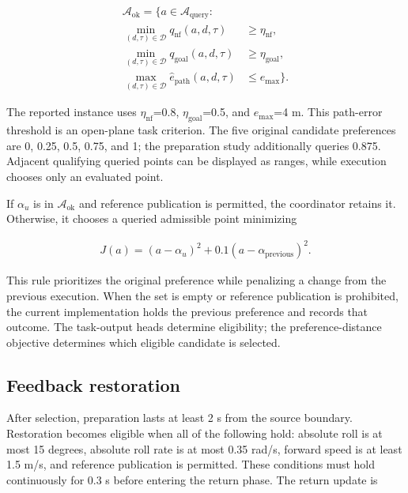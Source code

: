 \documentclass[journal]{IEEEtran}
\begin{document}
\begin{equation}\begin{aligned}
\mathcal A_{\mathrm{ok}}=\Big\{a\in\mathcal A_{\mathrm{query}}:\quad&\\
\min_{(d,\tau)\in\mathcal D}q_{\mathrm{nf}}(a,d,\tau)&\ge\eta_{\mathrm{nf}},\\
\min_{(d,\tau)\in\mathcal D}q_{\mathrm{goal}}(a,d,\tau)&\ge\eta_{\mathrm{goal}},\\
\max_{(d,\tau)\in\mathcal D}\hat e_{\mathrm{path}}(a,d,\tau)&\le e_{\max}\Big\}.
\end{aligned}\end{equation}

The reported instance uses $\eta_{\mathrm{nf}}$=0.8, $\eta_{\mathrm{goal}}$=0.5, and $e_{\max}$=4 m. This path-error threshold is an open-plane task criterion. The five original candidate preferences are 0, 0.25, 0.5, 0.75, and 1; the preparation study additionally queries 0.875. Adjacent qualifying queried points can be displayed as ranges, while execution chooses only an evaluated point.


If $\alpha_u$ is in $\mathcal A_{\mathrm{ok}}$ and reference publication is permitted, the coordinator retains it. Otherwise, it chooses a queried admissible point minimizing



\begin{equation}\begin{aligned}
J(a)=(a-\alpha_u)^2+0.1(a-\alpha_{\mathrm{previous}})^2.
\end{aligned}\end{equation}

This rule prioritizes the original preference while penalizing a change from the previous execution. When the set is empty or reference publication is prohibited, the current implementation holds the previous preference and records that outcome. The task-output heads determine eligibility; the preference-distance objective determines which eligible candidate is selected.


\subsection{Feedback restoration}

After selection, preparation lasts at least 2 s from the source boundary. Restoration becomes eligible when all of the following hold: absolute roll is at most 15 degrees, absolute roll rate is at most 0.35 rad/s, forward speed is at least 1.5 m/s, and reference publication is permitted. These conditions must hold continuously for 0.3 s before entering the return phase. The return update is
\end{document}
